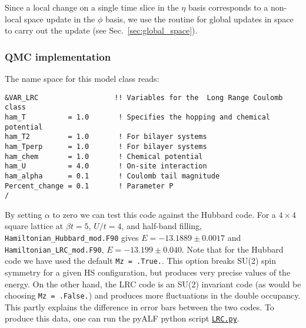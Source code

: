 Since a local change on  a single time slice in the $\eta$ basis corresponds to a non-local space update  in the $\phi$ basis, we  use the routine for global updates in space to carry out the update (see Sec.~\ref{sec:global_space}). 

\subsubsection*{ QMC implementation } 

The name space for this model class  reads: 

\begin{lstlisting}[style=fortran,escapechar=\#,breaklines=true]
&VAR_LRC                  !! Variables for the  Long Range Coulomb class
ham_T          = 1.0       ! Specifies the hopping and chemical potential
ham_T2         = 1.0       ! For bilayer systems
ham_Tperp      = 1.0       ! For bilayer systems
ham_chem       = 1.0       ! Chemical potential
ham_U          = 4.0       ! On-site interaction
ham_alpha      = 0.1       ! Coulomb tail magnitude
Percent_change = 0.1       ! Parameter P 
/
\end{lstlisting}

By setting $\alpha$ to zero we can test this code against the Hubbard code.   For a   $ 4 \times 4 $ square  lattice at $ \beta t = 5$, $U/t = 4$, and half-band filling,     \texttt{Hamiltonian\_Hubbard\_mod.F90}  gives $ E = -13.1889 \pm  0.0017 $  and \texttt{Hamiltonian\_LRC\_mod.F90}, $E = -13.199 \pm  0.040 $.    Note that for the  Hubbard code we have used  the default \texttt{Mz = .True.}.   This  option   breaks SU(2) spin symmetry for a given HS configuration, but produces very precise values of the energy. On the other hand,  the LRC code  is an SU(2) invariant code (as would be  choosing \texttt{Mz = .False.})  and  produces  more  fluctuations in the double occupancy.   This  partly explains the difference in  error  bars between the two codes.    To produce this data, one  can run the pyALF  python script \href{https://git.physik.uni-wuerzburg.de/ALF/pyALF/-/blob/master/Scripts/LRC.py}{\texttt{LRC.py}}.
  



